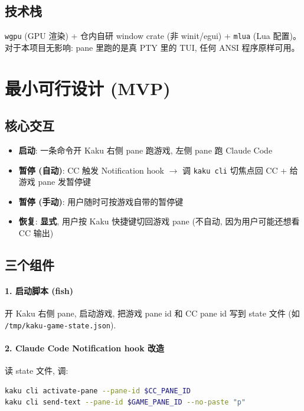 \documentclass[11pt]{article}
\begin{document}
\subsection{技术栈}

\texttt{wgpu} (GPU 渲染) + 仓内自研 window crate (非 winit/egui) +
\texttt{mlua} (Lua 配置)。
对于本项目无影响: pane 里跑的是真 PTY 里的 TUI, 任何 ANSI 程序原样可用。

\section{最小可行设计 (MVP)}

\subsection{核心交互}

\begin{itemize}[leftmargin=*]
  \item \textbf{启动}: 一条命令开 Kaku 右侧 pane 跑游戏, 左侧 pane 跑 Claude Code
  \item \textbf{暂停 (自动)}: CC 触发 Notification hook $\to$ 调 \texttt{kaku cli}
        切焦点回 CC + 给游戏 pane 发暂停键
  \item \textbf{暂停 (手动)}: 用户随时可按游戏自带的暂停键
  \item \textbf{恢复}: \textbf{显式}, 用户按 Kaku 快捷键切回游戏 pane
        (不自动, 因为用户可能还想看 CC 输出)
\end{itemize}

\subsection{三个组件}

\paragraph{1. 启动脚本 (fish)}
开 Kaku 右侧 pane, 启动游戏, 把游戏 pane id 和 CC pane id 写到 state 文件
(如 \texttt{/tmp/kaku-game-state.json}).

\paragraph{2. Claude Code Notification hook 改造}
读 state 文件, 调:
\begin{lstlisting}[language=bash]
kaku cli activate-pane --pane-id $CC_PANE_ID
kaku cli send-text --pane-id $GAME_PANE_ID --no-paste "p"
\end{lstlisting}
\end{document}
